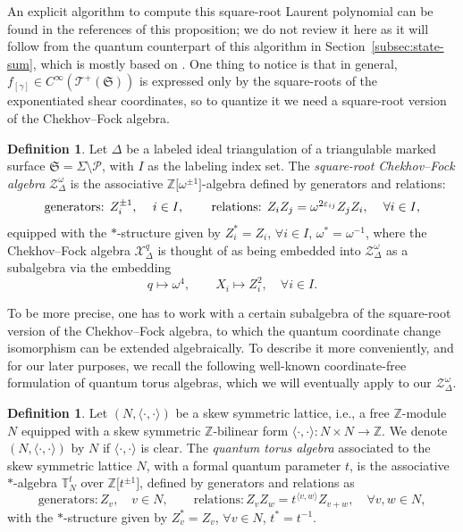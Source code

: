 \documentclass[pdftex]{sigma}
\numberwithin{equation}{section}
\theoremstyle{definition}
\newtheorem{Definition}[Theorem]{Definition}
\begin{document}
An explicit algorithm to compute this square-root Laurent polynomial can be found in the references of this proposition; we do not review it here as it will follow from the quantum counterpart of this algorithm in Section~\ref{subsec:state-sum}, which is mostly based on \cite{BW}.
One thing to notice is that in general, $f_{[\gamma]} \in C^\infty(\mathscr{T}^+(\mathfrak{S}))$ is expressed only by the square-roots of the exponentiated shear coordinates, so to quantize it we need a square-root version of the Chekhov--Fock algebra.
\begin{Definition}
Let $\Delta$ be a labeled ideal triangulation of a triangulable marked surface $\mathfrak{S} = \Sigma\setminus\mathcal{P}$, with $I$ as the labeling index set.
The {\em square-root Chekhov--Fock algebra} $\mathcal{Z}^\omega_\Delta$ is the associative $\mathbb{Z}\bigl[\omega^{\pm 1}\bigr]$-algebra defined by generators and relations:
\[
\mbox{generators: $Z_i^{\pm 1}$, \quad $i \in I$, \qquad relations: $Z_i Z_j = \omega^{2\varepsilon_{ij}} Z_j Z_i$, \quad $\forall i \in I$},
\]
equipped with the $*$-structure given by $Z_i^* = Z_i$, $\forall i \in I$, $\omega^* = \omega^{-1}$, where the Chekhov--Fock algebra $\mathcal{X}^q_\Delta$ is thought of as being embedded into $\mathcal{Z}^\omega_\Delta$ as a subalgebra via the embedding
\[
q \mapsto \omega^4, \qquad
X_i \mapsto Z_i^2, \quad \forall i \in I.
\]
\end{Definition}
To be more precise, one has to work with a certain subalgebra of the square-root version of the Chekhov--Fock algebra, to which the quantum coordinate change isomorphism can be extended algebraically. To describe it more conveniently, and for our later purposes, we recall the following well-known coordinate-free formulation of quantum torus algebras, which we will eventually apply to our $\mathcal{Z}^\omega_\Delta$.
\begin{Definition}
\label{def:QT}
Let $(N,\langle \cdot,\cdot\rangle)$ be a skew symmetric lattice, i.e., a free $\mathbb{Z}$-module $N$ equipped with a skew symmetric $\mathbb{Z}$-bilinear form $\langle \cdot, \cdot \rangle \colon N \times N \to \mathbb{Z}$. We denote $(N,\langle \cdot,\cdot\rangle)$ by $N$ if $\langle \cdot,\cdot\rangle$ is clear. The {\em quantum torus algebra} associated to the skew symmetric lattice $N$, with a formal quantum parameter $t$, is the associative $*$-algebra $\mathbb{T}^t_N$ over $\mathbb{Z}\bigl[t^{\pm 1}\bigr]$, defined by generators and relations as
\[
\mbox{generators}: Z_v, \quad v \in N, \qquad
\mbox{relations}: Z_v Z_w = t^{\langle v,w\rangle} Z_{v+w},\quad \forall v,w\in N,
\]
with the $*$-structure given by $Z_v^*=Z_v$, $\forall v\in N$, $t^* = t^{-1}$.
\end{Definition}
\end{document}
